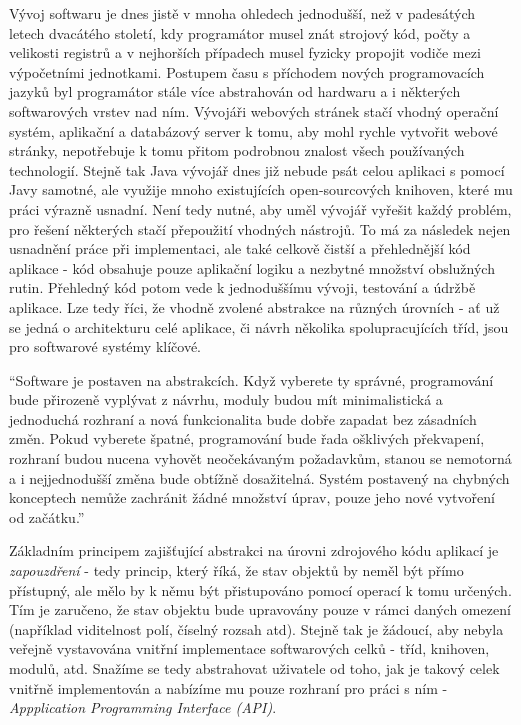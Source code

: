 Vývoj softwaru je dnes jistě v mnoha ohledech jednodušší, než v padesátých letech dvacátého století, kdy programátor musel znát strojový kód, počty a velikosti registrů a v nejhorších případech musel fyzicky propojit vodiče mezi výpočetními jednotkami. Postupem času s příchodem nových programovacích jazyků byl programátor stále více abstrahován od hardwaru a i některých softwarových vrstev nad ním. Vývojáři webových stránek stačí vhodný operační systém, aplikační a databázový server k tomu, aby mohl rychle vytvořit webové stránky, nepotřebuje k tomu přitom podrobnou znalost všech používaných technologií. Stejně tak Java vývojář dnes již nebude psát celou aplikaci s pomocí Javy samotné, ale využije mnoho existujících open-sourcových knihoven, které mu práci výrazně usnadní. Není tedy nutné, aby uměl vývojář vyřešit každý problém, pro řešení některých stačí přepoužití vhodných nástrojů. To má za následek nejen usnadnění práce při implementaci, ale také celkově čistší a přehlednější kód aplikace - kód obsahuje pouze aplikační logiku a nezbytné množství obslužných rutin. Přehledný kód potom vede k jednoduššímu vývoji, testování a údržbě aplikace. Lze tedy říci, že vhodně zvolené abstrakce na různých úrovních - ať už se jedná o architekturu celé aplikace, či návrh několika spolupracujících tříd, jsou pro softwarové systémy klíčové.

``Software je postaven na abstrakcích. Když vyberete ty správné, programování bude přirozeně vyplývat z návrhu, moduly budou mít minimalistická a jednoduchá rozhraní a nová funkcionalita bude dobře zapadat bez zásadních změn. Pokud vyberete špatné, programování bude řada ošklivých překvapení, rozhraní budou nucena vyhovět neočekávaným požadavkům, stanou se nemotorná a i nejjednodušší změna bude obtížně dosažitelná. Systém postavený na chybných konceptech nemůže zachránit žádné množství úprav, pouze jeho nové vytvoření od začátku.'' \cite{Jackson06}

Základním principem zajišťující abstrakci na úrovni zdrojového kódu aplikací je \textit{zapouzdření} - tedy princip, který říká, že stav objektů by neměl být přímo přístupný, ale mělo by k němu být přistupováno pomocí operací k tomu určených. Tím je zaručeno, že stav objektu bude upravovány pouze v rámci daných omezení (například viditelnost polí, číselný rozsah atd). Stejně tak je žádoucí, aby nebyla veřejně vystavována vnitřní implementace softwarových celků - tříd, knihoven, modulů, atd. Snažíme se tedy abstrahovat uživatele od toho, jak je takový celek vnitřně implementován a nabízíme mu pouze rozhraní pro práci s ním - \textit{Appplication Programming Interface (API)}.


